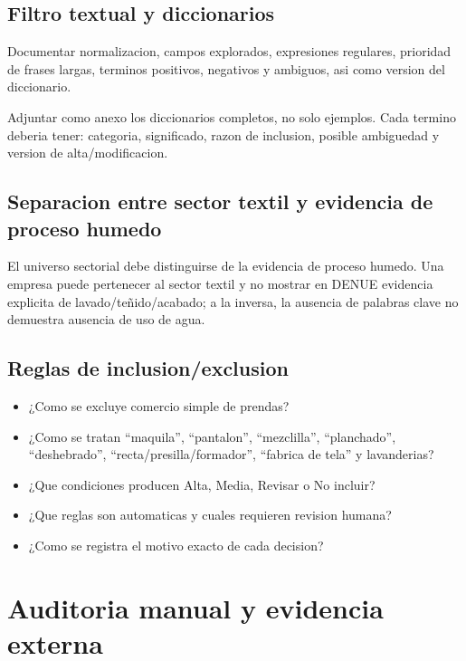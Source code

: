 \documentclass[11pt,letterpaper]{article}
\begin{document}
\subsection{Filtro textual y diccionarios}
Documentar normalizacion, campos explorados, expresiones regulares, prioridad de frases largas, terminos positivos, negativos y ambiguos, asi como version del diccionario.

\begin{evidencia}
Adjuntar como anexo los diccionarios completos, no solo ejemplos. Cada termino deberia tener: categoria, significado, razon de inclusion, posible ambiguedad y version de alta/modificacion.
\end{evidencia}

\subsection{Separacion entre sector textil y evidencia de proceso humedo}
\begin{alerta}
El universo sectorial debe distinguirse de la evidencia de proceso humedo. Una empresa puede pertenecer al sector textil y no mostrar en DENUE evidencia explicita de lavado/teñido/acabado; a la inversa, la ausencia de palabras clave no demuestra ausencia de uso de agua.
\end{alerta}

\subsection{Reglas de inclusion/exclusion}
\begin{preguntas}
\begin{itemize}
    \item ¿Como se excluye comercio simple de prendas?
    \item ¿Como se tratan ``maquila'', ``pantalon'', ``mezclilla'', ``planchado'', ``deshebrado'', ``recta/presilla/formador'', ``fabrica de tela'' y lavanderias?
    \item ¿Que condiciones producen Alta, Media, Revisar o No incluir?
    \item ¿Que reglas son automaticas y cuales requieren revision humana?
    \item ¿Como se registra el motivo exacto de cada decision?
\end{itemize}
\end{preguntas}

\section{Auditoria manual y evidencia externa}
\end{document}

